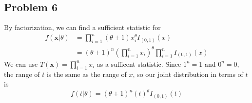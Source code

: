 \documentclass{article}
\begin{document}
\subsection*{Problem 6}
By factorization, we can find a sufficient statistic for 
\begin{align*}
f(\mathbf{x}|\theta) &= \prod_{i=1}^n (\theta+1)x_i^\theta I_{(0,1)}(x) \\
&=(\theta+1)^n\left(\prod_{i=1}^n x_i\right)^\theta \prod_{i=1}^n I_{(0,1)}(x)
\end{align*} 
We can use $T(\mathbf{x}) = \prod_{i=1}^n x_i$ as a sufficent statistic. Since $1^n = 1$ and $0^n = 0$, the range of $t$ is the same as the range of $x$, so our joint distribution in terms of $t$ is 
\[f(t|\theta) = (\theta+1)^n(t)^\theta I_{(0,1)}(t) \]
\end{document}
